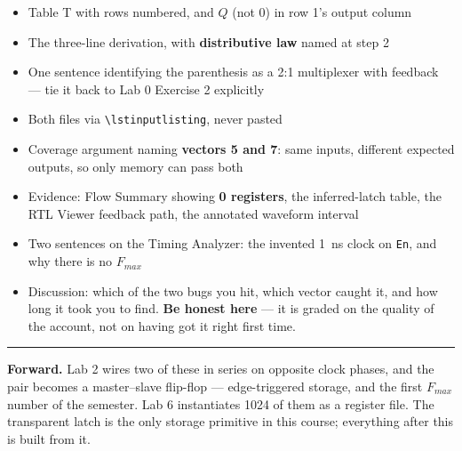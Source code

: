 \documentclass[11pt]{article}
\newcommand{\code}[1]{\texttt{#1}}
\newcommand{\hr}{\vspace{2pt}\hrule\vspace{6pt}}
\begin{document}
\begin{itemize}[leftmargin=1.6em,itemsep=1pt]
\item Table T with rows numbered, and $Q$ (not 0) in row 1's output column
\item The three-line derivation, with \textbf{distributive law} named at step 2
\item One sentence identifying the parenthesis as a 2:1 multiplexer with feedback ---
tie it back to Lab 0 Exercise 2 explicitly
\item Both files via \code{\textbackslash lstinputlisting}, never pasted
\item Coverage argument naming \textbf{vectors 5 and 7}: same inputs, different
expected outputs, so only memory can pass both
\item Evidence: Flow Summary showing \textbf{0 registers}, the inferred-latch table,
the RTL Viewer feedback path, the annotated waveform interval
\item Two sentences on the Timing Analyzer: the invented 1~ns clock on \code{En}, and
why there is no $F_{max}$
\item Discussion: which of the two bugs you hit, which vector caught it, and how long
it took you to find. \textbf{Be honest here} --- it is graded on the quality of the
account, not on having got it right first time.
\end{itemize}

\vspace{6pt}
\hr
{\small \textbf{Forward.} Lab 2 wires two of these in series on opposite clock
phases, and the pair becomes a master--slave flip-flop --- edge-triggered storage,
and the first $F_{max}$ number of the semester. Lab 6 instantiates 1024 of them as a
register file. The transparent latch is the only storage primitive in this course;
everything after this is built from it.}
\end{document}
